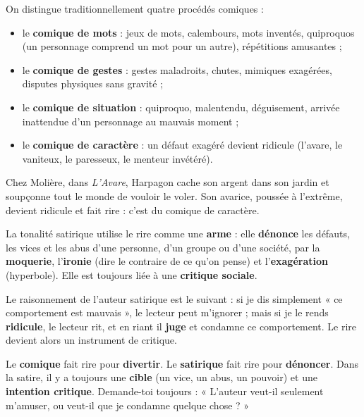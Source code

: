 \documentclass[11pt]{article}
\newcommand{\cle}[1]{{\popxbold\color{popdark}#1}}
\newcounter{popsec}
\newcounter{popsub}
\newcommand{\courssub}[1]{%
  \stepcounter{popsub}%
  \par\vspace{9pt}\noindent{\popxbold\fontsize{11.5}{13}\selectfont\color{popink}{\color{poporange}\thepopsec.\thepopsub}\hspace{6pt}#1}\par\nopagebreak\vspace{4pt}
}
\begin{document}
On distingue traditionnellement quatre procédés comiques :

\begin{itemize}
\item le \textbf{comique de mots} : jeux de mots, calembours, mots inventés, quiproquos (un personnage comprend un mot pour un autre), répétitions amusantes ;
\item le \textbf{comique de gestes} : gestes maladroits, chutes, mimiques exagérées, disputes physiques sans gravité ;
\item le \textbf{comique de situation} : quiproquo, malentendu, déguisement, arrivée inattendue d'un personnage au mauvais moment ;
\item le \textbf{comique de caractère} : un défaut exagéré devient ridicule (l'avare, le vaniteux, le paresseux, le menteur invétéré).
\end{itemize}

\begin{exemplebox}
Chez Molière, dans \emph{L'Avare}, Harpagon cache son argent dans son jardin et soupçonne tout le monde de vouloir le voler. Son avarice, poussée à l'extrême, devient ridicule et fait rire : c'est du comique de caractère.
\end{exemplebox}

\courssub{La tonalité satirique}

\begin{definition}
La tonalité \cle{satirique} utilise le rire comme une \textbf{arme} : elle \textbf{dénonce} les défauts, les vices et les abus d'une personne, d'un groupe ou d'une société, par la \textbf{moquerie}, l'\textbf{ironie} (dire le contraire de ce qu'on pense) et l'\textbf{exagération} (hyperbole). Elle est toujours liée à une \textbf{critique sociale}.
\end{definition}

Le raisonnement de l'auteur satirique est le suivant : si je dis simplement « ce comportement est mauvais », le lecteur peut m'ignorer ; mais si je le rends \textbf{ridicule}, le lecteur rit, et en riant il \textbf{juge} et condamne ce comportement. Le rire devient alors un instrument de critique.

\begin{attention}
Le \textbf{comique} fait rire pour \textbf{divertir}. Le \textbf{satirique} fait rire pour \textbf{dénoncer}. Dans la satire, il y a toujours une \textbf{cible} (un vice, un abus, un pouvoir) et une \textbf{intention critique}. Demande-toi toujours : « L'auteur veut-il seulement m'amuser, ou veut-il que je condamne quelque chose ? »
\end{attention}
\end{document}
